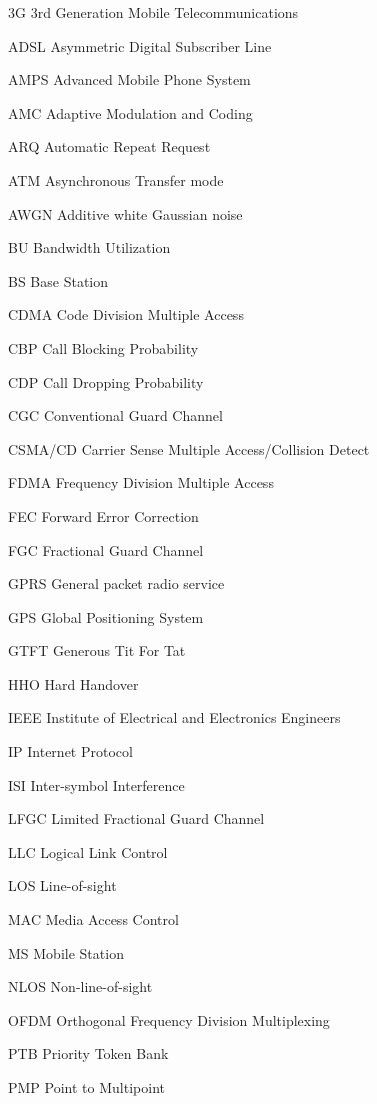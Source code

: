 \begin{denotation}
\item[3G] 3rd Generation Mobile Telecommunications
\item[ADSL] Asymmetric Digital Subscriber Line
\item[AMPS] Advanced Mobile Phone System
\item[AMC] Adaptive Modulation and Coding
\item[ARQ] Automatic Repeat Request
\item[ATM]Asynchronous Transfer mode
\item[AWGN]  Additive white Gaussian noise
\item[BU] Bandwidth Utilization
\item[BS] Base Station
\item[CDMA] Code Division Multiple Access 
\item[CBP] Call Blocking Probability
\item[CDP] Call Dropping Probability
\item[CGC] Conventional Guard Channel
\item[CSMA/CD] Carrier Sense Multiple Access/Collision Detect
\item[FDMA]Frequency Division Multiple Access
\item[FEC] Forward Error Correction
\item[FGC] Fractional Guard Channel
  \item[GPRS] General packet radio service
  \item[GPS] Global Positioning System
  \item[GTFT] Generous Tit For Tat
  \item[HHO] Hard Handover
  \item[IEEE] Institute of Electrical and Electronics Engineers
  \item[IP] Internet Protocol
  \item[ISI] Inter-symbol Interference
  \item[LFGC] Limited Fractional Guard Channel
  \item[LLC] Logical Link Control
  \item[LOS] Line-of-sight
  \item[MAC] Media Access Control
  \item[MS] Mobile Station
  \item[NLOS] Non-line-of-sight
  \item[OFDM] Orthogonal Frequency Division Multiplexing 
  \item[PTB] Priority Token Bank
  \item[PMP] Point to Multipoint

\end{denotation}
